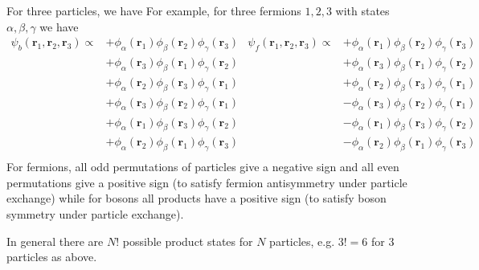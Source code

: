 \documentclass[11pt, a4paper]{article}
\begin{document}
\begin{itemize}
	For three particles, we have
	For example, for three fermions $ 1, 2, 3 $ with states $ \alpha, \beta, \gamma $ we have
	\begin{align*}
		\psi_{b}(\bm{r}_1, \bm{r}_2, \bm{r}_3) \propto & + \phi_{\alpha}(\bm{r}_1)\phi_{\beta}(\bm{r}_2)\phi_{\gamma}(\bm{r}_3) & \psi_{f}(\bm{r}_1, \bm{r}_2, \bm{r}_3) \propto & + \phi_{\alpha}(\bm{r}_1)\phi_{\beta}(\bm{r}_2)\phi_{\gamma}(\bm{r}_3)\\ 
		&+\phi_{\alpha}(\bm{r}_3)\phi_{\beta}(\bm{r}_1)\phi_{\gamma}(\bm{r}_2) & &+\phi_{\alpha}(\bm{r}_3)\phi_{\beta}(\bm{r}_1)\phi_{\gamma}(\bm{r}_2)\\ 
		&+\phi_{\alpha}(\bm{r}_2)\phi_{\beta}(\bm{r}_3)\phi_{\gamma}(\bm{r}_1) & &+\phi_{\alpha}(\bm{r}_2)\phi_{\beta}(\bm{r}_3)\phi_{\gamma}(\bm{r}_1)\\ 
		&+\phi_{\alpha}(\bm{r}_3)\phi_{\beta}(\bm{r}_2)\phi_{\gamma}(\bm{r}_1) & &-\phi_{\alpha}(\bm{r}_3)\phi_{\beta}(\bm{r}_2)\phi_{\gamma}(\bm{r}_1)\\ 
		&+\phi_{\alpha}(\bm{r}_1)\phi_{\beta}(\bm{r}_3)\phi_{\gamma}(\bm{r}_2) & &-\phi_{\alpha}(\bm{r}_1)\phi_{\beta}(\bm{r}_3)\phi_{\gamma}(\bm{r}_2)\\ 
		&+\phi_{\alpha}(\bm{r}_2)\phi_{\beta}(\bm{r}_1)\phi_{\gamma}(\bm{r}_3) & &-\phi_{\alpha}(\bm{r}_2)\phi_{\beta}(\bm{r}_1)\phi_{\gamma}(\bm{r}_3)\\ 
	\end{align*}
	For fermions, all odd permutations of particles give a negative sign and all even permutations give a positive sign (to satisfy fermion antisymmetry under particle exchange) while for bosons all products have a positive sign (to satisfy boson symmetry under particle exchange).
	
	In general there are $ N! $ possible product states for $ N $ particles, e.g. $ 3! = 6 $ for $ 3 $ particles as above.
	
\end{itemize}
\end{document}
